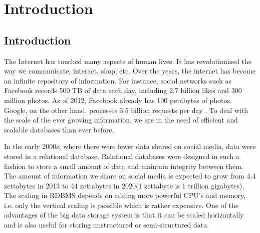 \documentclass[11pt,a4paper,bibtotoc,idxtotoc,headsepline,footsepline,footexclude,BCOR12mm,DIV13]{scrbook}
\begin{document}
	\frontmatter
	
	
	
	
	
	
%	
	\clearemptydoublepage
	
	
	
	
	
	
	
	
	

	\tableofcontents
  

	\mainmatter
	
	



\chapter{Introduction}
\label{chap:introduction}

\section{Introduction}
The Internet has touched many aspects of human lives. It has revolutionized the way we communicate, interact, shop, etc. Over the years, the internet has become an infinite repository of information. For instance, social networks such as Facebook records  500 TB of data each day\cite{daniel:datastats}, including 2.7 billion likes and 300 million photos. As of 2012, Facebook already has 100 petabytes of photos\cite{daniel:datastats}. Google, on the other hand, processes 3.5 billion requests per day \cite{daniel:datastats}. To deal with the scale of the ever growing information, we are in the need of efficient and scalable databases than ever before. 

In the early 2000s, where there were fewer data shared on social media, data were stored in a relational database. Relational databases were designed in such a fashion to store a small amount of data and maintain integrity between them\cite{matt:rdb}. The amount of information we share on social media is expected to grow from 4.4 zettabytes in 2013 to 44 zettabytes in 2020(1 zettabyte is 1 trillion gigabytes)\cite{matt:rdb}. The scaling in RDBMS depends on adding more powerful CPU's and memory, i.e. only the vertical scaling is possible which is rather expensive.  One of the advantages of the big data storage system is that it can be scaled horizontally and is also useful for storing unstructured or semi-structured data. 
\end{document}
